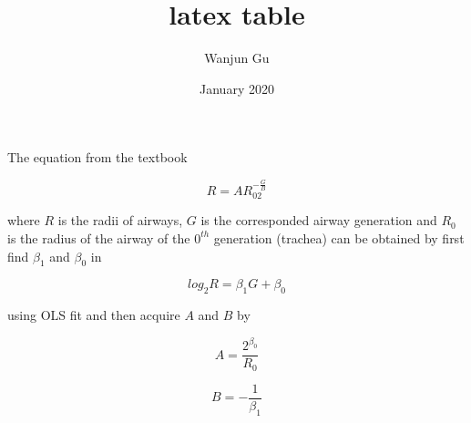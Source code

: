 \documentclass{article}
\title{latex table}
\author{Wanjun Gu}
\date{January 2020}
\begin{document}
The equation from the textbook

\begin{equation}
    R = AR_02^{-\frac{G}{B}}
\end{equation}

where $R$ is the radii of airways, $G$ is the corresponded airway generation and $R_0$ is the radius of the airway of the $0^{th}$ generation (trachea) can be obtained by first find $\beta_1$ and $\beta_0$ in 

\begin{equation}
    log_2R = \beta_1G + \beta_0
\end{equation}

using OLS fit and then acquire $A$ and $B$ by

\begin{equation}
    A = \frac{2^{\beta_0}}{R_0}
\end{equation}

\begin{equation}
    B = -\frac{1}{\beta_1}
\end{equation}
\end{document}
